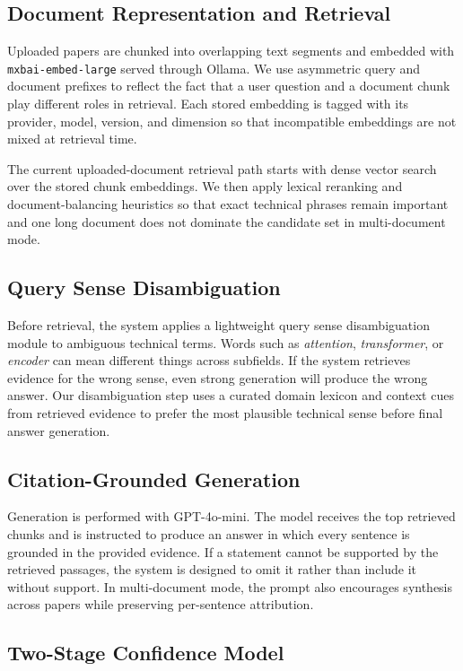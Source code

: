 \documentclass[10pt]{article}
\begin{document}
\subsection{Document Representation and Retrieval}

Uploaded papers are chunked into overlapping text segments and embedded
with \texttt{mxbai-embed-large} served through Ollama. We use
asymmetric query and document prefixes to reflect the fact that a user
question and a document chunk play different roles in retrieval. Each
stored embedding is tagged with its provider, model, version, and
dimension so that incompatible embeddings are not mixed at retrieval
time.

The current uploaded-document retrieval path starts with dense vector
search over the stored chunk embeddings. We then apply lexical
reranking and document-balancing heuristics so that exact technical
phrases remain important and one long document does not dominate the
candidate set in multi-document mode.

\subsection{Query Sense Disambiguation}

Before retrieval, the system applies a lightweight query sense
disambiguation module to ambiguous technical terms. Words such as
\textit{attention}, \textit{transformer}, or \textit{encoder} can mean
different things across subfields. If the system retrieves evidence for
the wrong sense, even strong generation will produce the wrong answer.
Our disambiguation step uses a curated domain lexicon and context cues
from retrieved evidence to prefer the most plausible technical sense
before final answer generation.

\subsection{Citation-Grounded Generation}

Generation is performed with GPT-4o-mini. The model receives the top
retrieved chunks and is instructed to produce an answer in which every
sentence is grounded in the provided evidence. If a statement cannot be
supported by the retrieved passages, the system is designed to omit it
rather than include it without support. In multi-document mode, the
prompt also encourages synthesis across papers while preserving
per-sentence attribution.

\subsection{Two-Stage Confidence Model}
\end{document}
